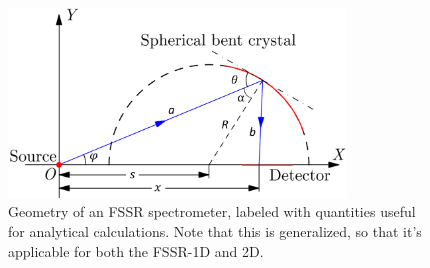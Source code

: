 \begin{figure}[H]
	\centering
	\includegraphics[width=0.8\textwidth]{Diagrams/FSSRDispersionYang.PNG}
	\caption{Geometry of an FSSR spectrometer, labeled with quantities useful 
		for analytical calculations. Note that this is generalized, so that 
		it's applicable for 
		both the FSSR-1D and 2D. \citep{yang2011focusing}}
	\label{DispersionFSSR}
\end{figure}

